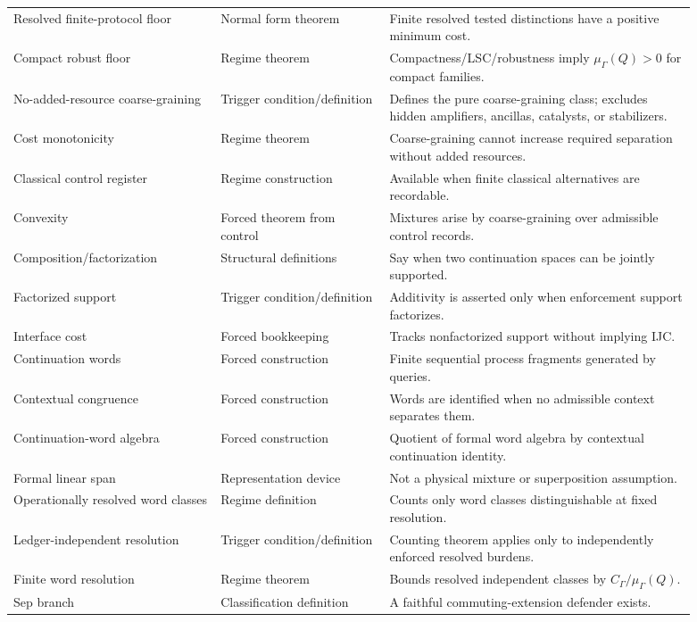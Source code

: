 \documentclass[11pt]{article}
\begin{document}
\begin{center}
\begin{longtable}{@{}p{0.27\linewidth}p{0.22\linewidth}p{0.40\linewidth}@{}}
Resolved finite-protocol floor & Normal form theorem & Finite resolved tested distinctions have a positive minimum cost. \\
Compact robust floor & Regime theorem & Compactness/LSC/robustness imply $\mu_\Gamma(Q)>0$ for compact families. \\
No-added-resource coarse-graining & Trigger condition/definition & Defines the pure coarse-graining class; excludes hidden amplifiers, ancillas, catalysts, or stabilizers. \\
Cost monotonicity & Regime theorem & Coarse-graining cannot increase required separation without added resources. \\
Classical control register & Regime construction & Available when finite classical alternatives are recordable. \\
Convexity & Forced theorem from control & Mixtures arise by coarse-graining over admissible control records. \\
Composition/factorization & Structural definitions & Say when two continuation spaces can be jointly supported. \\
Factorized support & Trigger condition/definition & Additivity is asserted only when enforcement support factorizes. \\
Interface cost & Forced bookkeeping & Tracks nonfactorized support without implying IJC. \\
Continuation words & Forced construction & Finite sequential process fragments generated by queries. \\
Contextual congruence & Forced construction & Words are identified when no admissible context separates them. \\
Continuation-word algebra & Forced construction & Quotient of formal word algebra by contextual continuation identity. \\
Formal linear span & Representation device & Not a physical mixture or superposition assumption. \\
Operationally resolved word classes & Regime definition & Counts only word classes distinguishable at fixed resolution. \\
Ledger-independent resolution & Trigger condition/definition & Counting theorem applies only to independently enforced resolved burdens. \\
Finite word resolution & Regime theorem & Bounds resolved independent classes by $C_\Gamma/\mu_\Gamma(Q)$. \\
Sep branch & Classification definition & A faithful commuting-extension defender exists. \\

\end{longtable}
\end{center}
\end{document}
